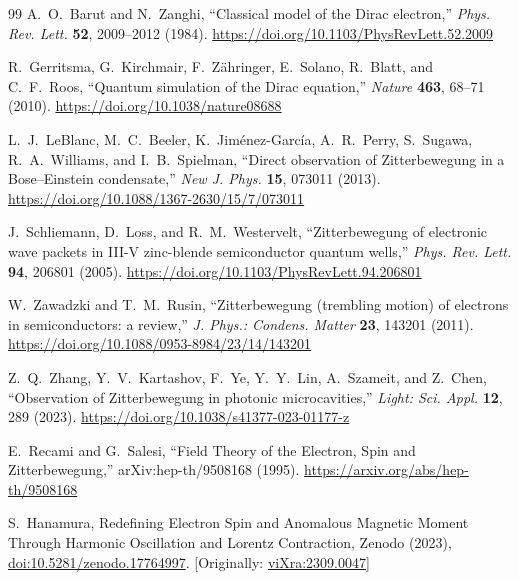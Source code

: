 \documentclass[%
 reprint,
 amsmath,amssymb,
 aps,
]{revtex4-1}
\numberwithin{equation}{section}%
\begin{document}
\begin{thebibliography}{99}
A.~O.~Barut and N.~Zanghi, 
``Classical model of the Dirac electron,'' 
\textit{Phys. Rev. Lett.} \textbf{52}, 2009--2012 (1984).
\href{https://doi.org/10.1103/PhysRevLett.52.2009}{https://doi.org/10.1103/PhysRevLett.52.2009}

R.~Gerritsma, G.~Kirchmair, F.~Z{\"a}hringer, E.~Solano, R.~Blatt, and C.~F.~Roos, 
``Quantum simulation of the Dirac equation,'' 
\textit{Nature} \textbf{463}, 68--71 (2010). 
\href{https://doi.org/10.1038/nature08688}{https://doi.org/10.1038/nature08688}

L.~J.~LeBlanc, M.~C.~Beeler, K.~Jim{\'e}nez-Garc{\'i}a, A.~R.~Perry, S.~Sugawa, R.~A.~Williams, and I.~B.~Spielman, 
``Direct observation of Zitterbewegung in a Bose–Einstein condensate,'' 
\textit{New J. Phys.} \textbf{15}, 073011 (2013). 
\href{https://doi.org/10.1088/1367-2630/15/7/073011}{https://doi.org/10.1088/1367-2630/15/7/073011}

J.~Schliemann, D.~Loss, and R.~M.~Westervelt, 
``Zitterbewegung of electronic wave packets in III-V zinc-blende semiconductor quantum wells,'' 
\textit{Phys. Rev. Lett.} \textbf{94}, 206801 (2005). 
\href{https://doi.org/10.1103/PhysRevLett.94.206801}{https://doi.org/10.1103/PhysRevLett.94.206801}

W.~Zawadzki and T.~M.~Rusin, 
``Zitterbewegung (trembling motion) of electrons in semiconductors: a review,'' 
\textit{J. Phys.: Condens. Matter} \textbf{23}, 143201 (2011). 
\href{https://doi.org/10.1088/0953-8984/23/14/143201}{https://doi.org/10.1088/0953-8984/23/14/143201}

Z.~Q.~Zhang, Y.~V.~Kartashov, F.~Ye, Y.~Y.~Lin, A.~Szameit, and Z.~Chen, 
``Observation of Zitterbewegung in photonic microcavities,'' 
\textit{Light: Sci. Appl.} \textbf{12}, 289 (2023). 
\href{https://doi.org/10.1038/s41377-023-01177-z}{https://doi.org/10.1038/s41377-023-01177-z}

E.~Recami and G.~Salesi, 
``Field Theory of the Electron, Spin and Zitterbewegung,'' 
arXiv:hep-th/9508168 (1995). 
\href{https://arxiv.org/abs/hep-th/9508168}{https://arxiv.org/abs/hep-th/9508168}

S.~Hanamura, Redefining Electron Spin and Anomalous Magnetic Moment Through Harmonic Oscillation and Lorentz Contraction, Zenodo (2023), \href{https://doi.org/10.5281/zenodo.17764997}{doi:10.5281/zenodo.17764997}. [Originally: \href{https://vixra.org/abs/2309.0047}{viXra:2309.0047}]


\end{thebibliography}
\end{document}
